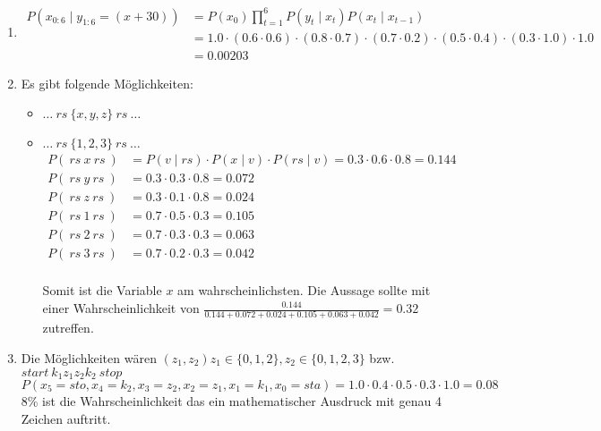 \documentclass[a4paper,10pt]{article}
\begin{document}
\begin{enumerate}[~~(a)]
\begin{center}
    \end{center}
    \item
    \begin{align*}
        P(x_{0:6} \mid y_{1:6} = (x+30)) &= P(x_0)\prod_{t=1}^{6}P(y_t\mid x_t)P(x_t\mid x_{t - 1}) \\
        &= 1.0  \cdot (0.6 \cdot 0.6) \cdot (0.8 \cdot 0.7) \cdot (0.7 \cdot 0.2) \cdot (0.5 \cdot 0.4) \cdot (0.3 \cdot 1.0) \cdot 1.0 \\
        &= 0.00203
    \end{align*}

    \item Es gibt folgende Möglichkeiten:
    \begin{itemize}
        \item $\dots ~rs~ \{x, y, z\} ~rs~ \dots$
        \item $\dots ~rs~ \{1, 2 ,3\} ~rs~ \dots$
        \begin{align*}
            P(~rs~ x ~rs~) &= P(v \mid rs) \cdot P(x \mid v) \cdot P(rs \mid v) = 0.3 \cdot 0.6 \cdot 0.8 = 0.144 \\
            P(~rs~ y ~rs~) &= 0.3 \cdot 0.3 \cdot 0.8 = 0.072 \\
            P(~rs~ z ~rs~) &= 0.3 \cdot 0.1 \cdot 0.8 = 0.024 \\
            P(~rs~ 1 ~rs~) &= 0.7 \cdot 0.5 \cdot 0.3 = 0.105 \\
            P(~rs~ 2 ~rs~) &= 0.7 \cdot 0.3 \cdot 0.3 = 0.063 \\
            P(~rs~ 3 ~rs~) &= 0.7 \cdot 0.2 \cdot 0.3 = 0.042 \\
        \end{align*}

        Somit ist die Variable $x$ am wahrscheinlichsten. Die Aussage sollte mit einer Wahrscheinlichkeit von $\frac{0.144}{0.144 + 0.072 + 0.024 + 0.105 + 0.063 + 0.042} = 0.32$ zutreffen.

    \end{itemize}
    \item Die Möglichkeiten wären $(z_1, z_2) z_1 \in \{0,1,2\}, z_2 \in \{0,1,2,3\}$ bzw. $start~k_1 z_1 z_2 k_2~stop$
    $$P(x_5 = sto,x_4 = k_2, x_3 = z_2, x_2 = z_1, x_1 = k_1, x_0 = sta) = 1.0 \cdot 0.4 \cdot 0.5 \cdot 0.3 \cdot 1.0 = 0.08$$
    8\% ist die Wahrscheinlichkeit das ein mathematischer Ausdruck mit genau 4 Zeichen auftritt.
\end{enumerate}
\end{document}
